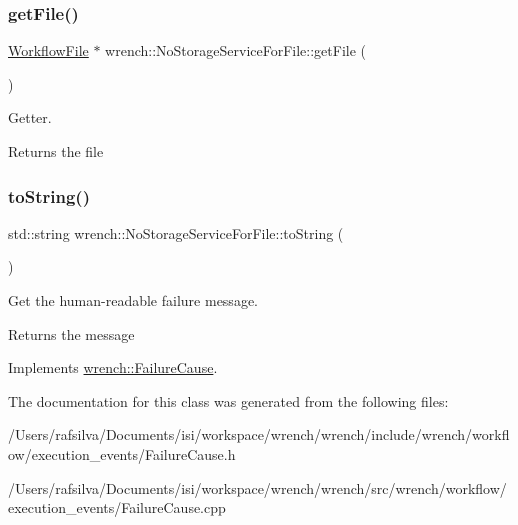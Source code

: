 \subsubsection{\texorpdfstring{get\+File()}{getFile()}}
{\footnotesize\ttfamily \hyperlink{classwrench_1_1_workflow_file}{Workflow\+File} $\ast$ wrench\+::\+No\+Storage\+Service\+For\+File\+::get\+File (\begin{DoxyParamCaption}{ }\end{DoxyParamCaption})}



Getter. 

\begin{DoxyReturn}{Returns}
the file 
\end{DoxyReturn}
\mbox{\label{classwrench_1_1_no_storage_service_for_file_ab3941ca284f35abd00e9292e22d7d553}} 
\subsubsection{\texorpdfstring{to\+String()}{toString()}}
{\footnotesize\ttfamily std\+::string wrench\+::\+No\+Storage\+Service\+For\+File\+::to\+String (\begin{DoxyParamCaption}{ }\end{DoxyParamCaption})\hspace{0.3cm}{\ttfamily [virtual]}}



Get the human-\/readable failure message. 

\begin{DoxyReturn}{Returns}
the message 
\end{DoxyReturn}


Implements \hyperlink{classwrench_1_1_failure_cause_afbad248ebe902409f2cd4f1d6f2b867d}{wrench\+::\+Failure\+Cause}.



The documentation for this class was generated from the following files\+:\begin{DoxyCompactItemize}
\item 
/\+Users/rafsilva/\+Documents/isi/workspace/wrench/wrench/include/wrench/workflow/execution\+\_\+events/Failure\+Cause.\+h\item 
/\+Users/rafsilva/\+Documents/isi/workspace/wrench/wrench/src/wrench/workflow/execution\+\_\+events/Failure\+Cause.\+cpp\end{DoxyCompactItemize}
